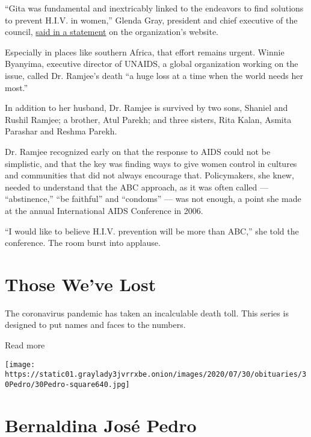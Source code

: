 ``Gita was fundamental and inextricably linked to the endeavors to find
solutions to prevent H.I.V. in women,'' Glenda Gray, president and chief
executive of the council,
\href{https://www.samrc.ac.za/media-release/samrc-mourns-loss-eminent-scientist-prof-gita-ramjee}{said
in a statement} on the organization's website.

Especially in places like southern Africa, that effort remains urgent.
Winnie Byanyima, executive director of UNAIDS, a global organization
working on the issue, called Dr. Ramjee's death ``a huge loss at a time
when the world needs her most.''

In addition to her husband, Dr. Ramjee is survived by two sons, Shaniel
and Rushil Ramjee; a brother, Atul Parekh; and three sisters, Rita
Kalan, Asmita Parashar and Reshma Parekh.

Dr. Ramjee recognized early on that the response to AIDS could not be
simplistic, and that the key was finding ways to give women control in
cultures and communities that did not always encourage that.
Policymakers, she knew, needed to understand that the ABC approach, as
it was often called --- ``abstinence,'' ``be faithful'' and ``condoms''
--- was not enough, a point she made at the annual International AIDS
Conference in 2006.

``I would like to believe H.I.V. prevention will be more than ABC,'' she
told the conference. The room burst into applause.

\href{https://www.nytimes3xbfgragh.onion/interactive/2020/obituaries/people-died-coronavirus-obituaries.html?action=click\&pgtype=Article\&state=default\&region=BELOW_MAIN_CONTENT\&context=covid_obits_promo}{}

\hypertarget{those-weve-lost}{%
\section{Those We've Lost}\label{those-weve-lost}}

The coronavirus pandemic has taken an incalculable death toll. This
series is designed to put names and faces to the numbers.

Read more

\texttt{[image: https://static01.graylady3jvrrxbe.onion/images/2020/07/30/obituaries/30Pedro/30Pedro-square640.jpg]}

\hypertarget{bernaldina-josuxe9-pedro}{%
\section{Bernaldina José Pedro}\label{bernaldina-josuxe9-pedro}}

